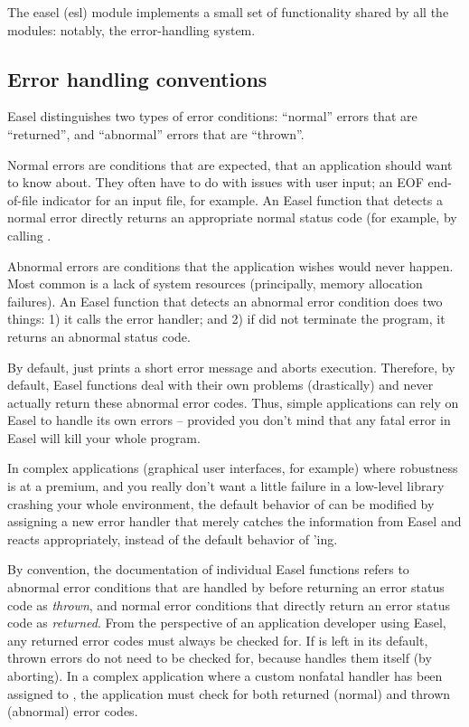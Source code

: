 The easel (esl) module implements a small set of functionality shared
by all the modules: notably, the error-handling system.

\subsection{Error handling conventions}

Easel distinguishes two types of error conditions: ``normal'' errors
that are ``returned'', and ``abnormal'' errors that are ``thrown''.

Normal errors are conditions that are expected, that an application
should want to know about. They often have to do with issues with user
input; an EOF end-of-file indicator for an input file, for example. An
Easel function that detects a normal error directly returns an
appropriate normal status code (for example, by calling .

Abnormal errors are conditions that the application wishes would never
happen. Most common is a lack of system resources (principally, memory
allocation failures). An Easel function that detects an abnormal error
condition does two things: 1) it calls the  error
handler; and 2) if  did not terminate the program,
it returns an abnormal status code.

By default,  just prints a short error message and
aborts execution. Therefore, by default, Easel functions deal with
their own problems (drastically) and never actually return these
abnormal error codes. Thus, simple applications can rely on Easel to
handle its own errors -- provided you don't mind that any fatal error
in Easel will kill your whole program.

In complex applications (graphical user interfaces, for example) where
robustness is at a premium, and you really don't want a little failure
in a low-level library crashing your whole environment, the default
behavior of  can be modified by assigning a new
error handler that merely catches the information from Easel and
reacts appropriately, instead of the default behavior of
'ing.

By convention, the documentation of individual Easel functions refers
to abnormal error conditions that are handled by 
before returning an error status code as \emph{thrown}, and normal
error conditions that directly return an error status code as
\emph{returned}.  From the perspective of an application developer
using Easel, any returned error codes must always be checked for. If
 is left in its default, thrown errors do not need
to be checked for, because  handles them itself (by
aborting). In a complex application where a custom nonfatal handler
has been assigned to , the application must check
for both returned (normal) and thrown (abnormal) error codes.


